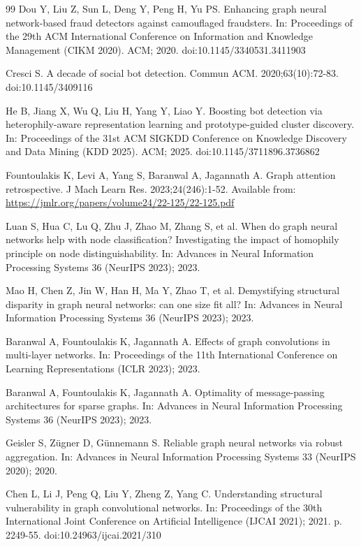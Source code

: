 \documentclass[fonts]{icst}
\theoremstyle{definition}
\begin{document}
\begin{thebibliography}{99}
Dou Y, Liu Z, Sun L, Deng Y, Peng H, Yu PS. Enhancing graph neural network-based fraud detectors against camouflaged fraudsters. In: Proceedings of the 29th ACM International Conference on Information and Knowledge Management (CIKM 2020). ACM; 2020. doi:10.1145/3340531.3411903

Cresci S. A decade of social bot detection. Commun ACM. 2020;63(10):72-83. doi:10.1145/3409116

He B, Jiang X, Wu Q, Liu H, Yang Y, Liao Y. Boosting bot detection via heterophily-aware representation learning and prototype-guided cluster discovery. In: Proceedings of the 31st ACM SIGKDD Conference on Knowledge Discovery and Data Mining (KDD 2025). ACM; 2025. doi:10.1145/3711896.3736862

Fountoulakis K, Levi A, Yang S, Baranwal A, Jagannath A. Graph attention retrospective. J Mach Learn Res. 2023;24(246):1-52. Available from: \url{https://jmlr.org/papers/volume24/22-125/22-125.pdf}

Luan S, Hua C, Lu Q, Zhu J, Zhao M, Zhang S, et al. When do graph neural networks help with node classification? Investigating the impact of homophily principle on node distinguishability. In: Advances in Neural Information Processing Systems 36 (NeurIPS 2023); 2023.

Mao H, Chen Z, Jin W, Han H, Ma Y, Zhao T, et al. Demystifying structural disparity in graph neural networks: can one size fit all? In: Advances in Neural Information Processing Systems 36 (NeurIPS 2023); 2023.

Baranwal A, Fountoulakis K, Jagannath A. Effects of graph convolutions in multi-layer networks. In: Proceedings of the 11th International Conference on Learning Representations (ICLR 2023); 2023.

Baranwal A, Fountoulakis K, Jagannath A. Optimality of message-passing architectures for sparse graphs. In: Advances in Neural Information Processing Systems 36 (NeurIPS 2023); 2023.

Geisler S, Z\"ugner D, G\"unnemann S. Reliable graph neural networks via robust aggregation. In: Advances in Neural Information Processing Systems 33 (NeurIPS 2020); 2020.

Chen L, Li J, Peng Q, Liu Y, Zheng Z, Yang C. Understanding structural vulnerability in graph convolutional networks. In: Proceedings of the 30th International Joint Conference on Artificial Intelligence (IJCAI 2021); 2021. p. 2249-55. doi:10.24963/ijcai.2021/310


\end{thebibliography}
\end{document}
